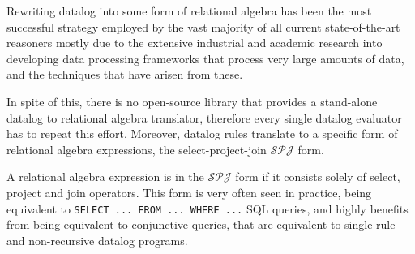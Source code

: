 Rewriting datalog into some form of relational algebra has been the most successful strategy employed by the vast majority of all current state-of-the-art
reasoners\cite{bigdatalog, cog, nexus, recstep, dcdatalog, souffle} mostly due to the extensive industrial and academic research into developing data processing frameworks that
process very large amounts of data, and the techniques that have arisen from these.

In spite of this, there is no open-source library that provides a stand-alone datalog to relational algebra translator, therefore every single
datalog evaluator has to repeat this effort. Moreover, datalog rules translate to a specific form of relational algebra expressions, the
select-project-join $\mathcal{SPJ}$ form.

A relational algebra expression is in the $\mathcal{SPJ}$ form if it consists solely of select, project and join operators. This form
is very often seen in practice, being equivalent to \verb|SELECT ... FROM ... WHERE ...| SQL queries, and highly benefits from being
equivalent to conjunctive queries, that are equivalent to single-rule and non-recursive datalog programs.

